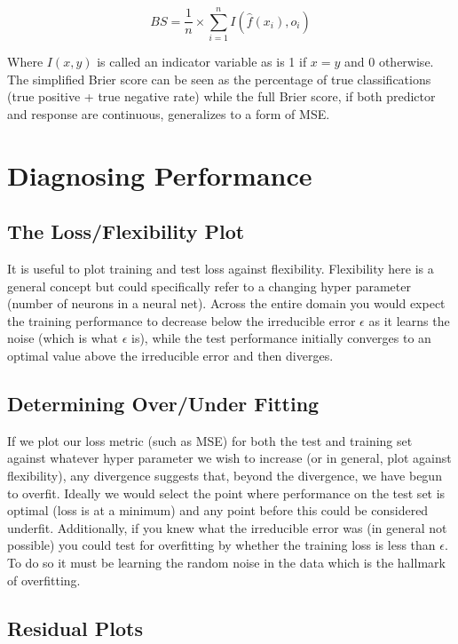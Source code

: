 $$ BS = \frac{1}{n} \times \sum^{n}_{i=1} I(\hat{f}(x_{i}),o_{i}) $$

Where $I(x,y)$ is called an indicator variable as is 1 if $x = y$ and 0 otherwise. The simplified Brier score can be seen as the percentage of true classifications (true positive + true negative rate) while the full Brier score, if both predictor and response are continuous, generalizes to a form of MSE.

\section{Diagnosing Performance}

\subsection{The Loss/Flexibility Plot}

It is useful to plot training and test loss against flexibility. Flexibility here is a general concept but could specifically refer to a changing hyper parameter (number of neurons in a neural net). Across the entire domain you would expect the training performance to decrease below the irreducible error $\epsilon$ as it learns the noise (which is what $\epsilon$ is), while the test performance initially converges to an optimal value above the irreducible error and then diverges.

\subsection{Determining Over/Under Fitting}

If we plot our loss metric (such as MSE) for both the test and training set against whatever hyper parameter we wish to increase (or in general, plot against flexibility), any divergence suggests that, beyond the divergence, we have begun to overfit. Ideally we would select the point where performance on the test set is optimal (loss is at a minimum) and any point before this could be considered underfit. Additionally, if you knew what the irreducible error was (in general not possible) you could test for overfitting by whether the training loss is less than $\epsilon$. To do so it must be learning the random noise in the data which is the hallmark of overfitting.

\subsection{Residual Plots}

